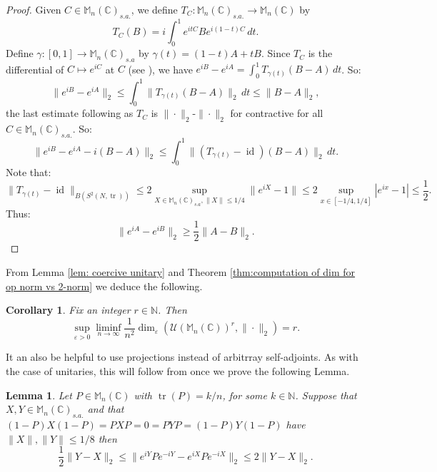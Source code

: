 \documentclass[10pt]{amsart}
\newtheorem{lem}[thm]{Lemma}
\newtheorem{cor}[thm]{Corollary}
\theoremstyle{definition}
\numberwithin{equation}{section}
\newcommand{\bC}{{\mathbb C}}
\newcommand{\bM}{{\mathbb M}}
\newcommand{\bN}{{\mathbb N}}
\newcommand{\cU}{{\mathcal U}}
\DeclareMathOperator{\id}{id}
\DeclareMathOperator{\tr}{tr}
\begin{document}
\begin{proof}
Given $C\in \bM_{n}(\bC)_{s.a.}$, we define $T_{C}\colon \bM_{n}(\bC)_{s.a.}\to \bM_{n}(\bC)$ by 
\[T_{C}(B)=i\int_{0}^{1}e^{it C}Be^{i(1-t)C}\,dt.\]
Define $\gamma\colon [0,1]\to \bM_{n}(\bC)_{s.a}$ by $\gamma(t)=(1-t)A+tB$. Since $T_{C}$ is the differential of $C\mapsto e^{iC}$ at $C$ (see \cite[Chapter, Section 14 on perturbation theory]{Bellman}), we have $e^{iB}-e^{iA}=\int_{0}^{1}T_{\gamma(t)}(B-A)\,dt$. So:
\[\|e^{iB}-e^{iA}\|_{2}\leq \int_{0}^{1}\|T_{\gamma(t)}(B-A)\|_{2}\,dt\leq \|B-A\|_{2},\]
the last estimate following as $T_{C}$ is $\|\cdot\|_{2}$-$\|\cdot\|_{2}$ for contractive for all $C\in \bM_{n}(\bC)_{s.a.}$. 
So:
\[\|e^{iB}-e^{iA}-i(B-A)\|_{2}\leq \int_{0}^{1}\|(T_{\gamma(t)}-\id)(B-A)\|_{2}\,dt.\]
Note that:
\[\|T_{\gamma(t)}-\id\|_{B(S^{2}(N,\tr))}\leq 2\sup_{X\in \bM_{n}(\bC)_{s.a},\|X\|\leq 1/4}\|e^{iX}-1\|\leq 2\sup_{x\in [-1/4,1/4]}|e^{ix}-1|\leq \frac{1}{2}.\]
Thus:
\[\|e^{iA}-e^{iB}\|_{2}\geq \frac{1}{2}\|A-B\|_{2}.\]

\end{proof}

From Lemma \ref{lem: coercive unitary} and Theorem \ref{thm:computation of dim for op norm vs 2-norm} we deduce the following. 

\begin{cor}\label{cor: epsilon dim of unitaries}
Fix an integer $r\in \bN$. Then
\[\sup_{\varepsilon>0}\liminf_{n\to\infty}\frac{1}{n^{2}}\dim_{\varepsilon}(\cU(\bM_{n}(\bC))^{r},\|\cdot\|_{2})=r.\]

\end{cor}

It an also be helpful to use projections instead of arbitrray self-adjoints. As with the case of unitaries, this will follow from once we prove the following Lemma.

\begin{lem}\label{lem: case of projections}
Let $P\in \bM_{n}(\bC)$ with $\tr(P)=k/n$, for some $k\in \bN$. Suppose that $X,Y\in \bM_{n}(\bC)_{s.a.}$ and that $(1-P)X(1-P)=PXP=0=PYP=(1-P)Y(1-P)$ have $\|X\|,\|Y\|\leq 1/8$ then
\[\frac{1}{2}\|Y-X\|_{2}\leq \|e^{iY}Pe^{-iY}-e^{iX}Pe^{-iX}\|_{2}\leq 2\|Y-X\|_{2}.\]
\end{lem}
\end{document}
